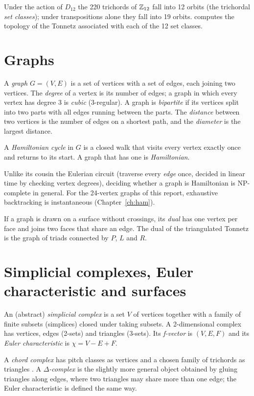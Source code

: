 \begin{remark}
Under the action of $D_{12}$ the 220 trichords of $\mathbb{Z}_{12}$ fall into 12 orbits (the trichordal \emph{set
classes}); under transpositions alone they fall into 19 orbits.  computes the topology of the
Tonnetz associated with each of the 12 set classes.
\end{remark}

\section{Graphs}
A \emph{graph} $G=(V,E)$ is a set of vertices with a set of edges, each joining two vertices. The \emph{degree}
of a vertex is its number of edges; a graph in which every vertex has degree 3 is \emph{cubic} (3-regular). A
graph is \emph{bipartite} if its vertices split into two parts with all edges running between the parts. The
\emph{distance} between two vertices is the number of edges on a shortest path, and the \emph{diameter} is the
largest distance.

\begin{definition}
A \emph{Hamiltonian cycle} in $G$ is a closed walk that visits every vertex exactly once and returns to its start.
A graph that has one is \emph{Hamiltonian}.
\end{definition}

Unlike its cousin the Eulerian circuit (traverse every \emph{edge} once, decided in linear time by checking vertex
degrees), deciding whether a graph is Hamiltonian is NP-complete in general. For the 24-vertex graphs of this
report, exhaustive backtracking is instantaneous (Chapter~\ref{ch:ham}).

If a graph is drawn on a surface without crossings, its \emph{dual} has one vertex per face and joins two faces
that share an edge. The dual of the triangulated Tonnetz is the graph of triads connected by $P$, $L$ and $R$.

\section{Simplicial complexes, Euler characteristic and surfaces}
\begin{definition}
An (abstract) \emph{simplicial complex} is a set $V$ of vertices together with a family of finite subsets
(simplices) closed under taking subsets. A 2-dimensional complex has vertices, edges (2-sets) and triangles
(3-sets). Its \emph{f-vector} is $(V,E,F)$ and its \emph{Euler characteristic} is $\chi=V-E+F$.
\end{definition}
A \emph{chord complex} has pitch classes as vertices and a chosen family of trichords as triangles
\citep{bigo2013}. A \emph{$\Delta$-complex} is the slightly more general object obtained by gluing triangles
along edges, where two triangles may share more than one edge; the Euler characteristic is defined the same way.

